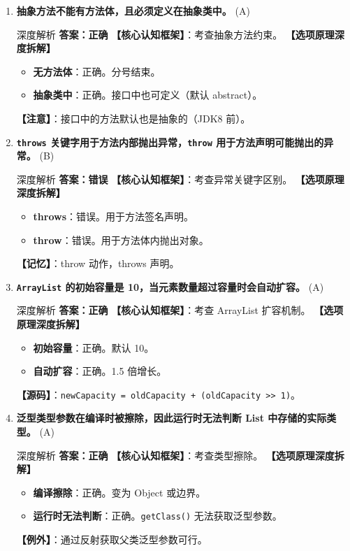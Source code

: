 \documentclass[12pt, a4paper]{ctexart}
\newcommand{\code}[1]{\texttt{#1}}
\newcommand{\tfblank}{\underline{\hspace{1.5em}}}
\begin{document}
\begin{enumerate}[label=\textbf{\arabic*.}, itemsep=1em]
    \item \textbf{抽象方法不能有方法体，且必须定义在抽象类中。} \tfblank (A)
    \begin{bluebox}{深度解析}
    \textbf{答案：正确}
    \textbf{【核心认知框架】}：考查抽象方法约束。
    \textbf{【选项原理深度拆解】}
    \begin{itemize}[leftmargin=*, nosep]
        \item \textbf{无方法体}：正确。分号结束。
        \item \textbf{抽象类中}：正确。接口中也可定义（默认 abstract）。
    \end{itemize}
    \textbf{【注意】}：接口中的方法默认也是抽象的（JDK8 前）。
    \end{bluebox}

    \item \textbf{\code{throws} 关键字用于方法内部抛出异常，\code{throw} 用于方法声明可能抛出的异常。} \tfblank (B)
    \begin{bluebox}{深度解析}
    \textbf{答案：错误}
    \textbf{【核心认知框架】}：考查异常关键字区别。
    \textbf{【选项原理深度拆解】}
    \begin{itemize}[leftmargin=*, nosep]
        \item \textbf{throws}：错误。用于方法签名声明。
        \item \textbf{throw}：错误。用于方法体内抛出对象。
    \end{itemize}
    \textbf{【记忆】}：throw 动作，throws 声明。
    \end{bluebox}

    \item \textbf{\code{ArrayList} 的初始容量是 10，当元素数量超过容量时会自动扩容。} \tfblank (A)
    \begin{bluebox}{深度解析}
    \textbf{答案：正确}
    \textbf{【核心认知框架】}：考查 ArrayList 扩容机制。
    \textbf{【选项原理深度拆解】}
    \begin{itemize}[leftmargin=*, nosep]
        \item \textbf{初始容量}：正确。默认 10。
        \item \textbf{自动扩容}：正确。1.5 倍增长。
    \end{itemize}
    \textbf{【源码】}：\code{newCapacity = oldCapacity + (oldCapacity >> 1)}。
    \end{bluebox}

    \item \textbf{泛型类型参数在编译时被擦除，因此运行时无法判断 List 中存储的实际类型。} \tfblank (A)
    \begin{bluebox}{深度解析}
    \textbf{答案：正确}
    \textbf{【核心认知框架】}：考查类型擦除。
    \textbf{【选项原理深度拆解】}
    \begin{itemize}[leftmargin=*, nosep]
        \item \textbf{编译擦除}：正确。变为 Object 或边界。
        \item \textbf{运行时无法判断}：正确。\code{getClass()} 无法获取泛型参数。
    \end{itemize}
    \textbf{【例外】}：通过反射获取父类泛型参数可行。
    \end{bluebox}


\end{enumerate}
\end{document}
